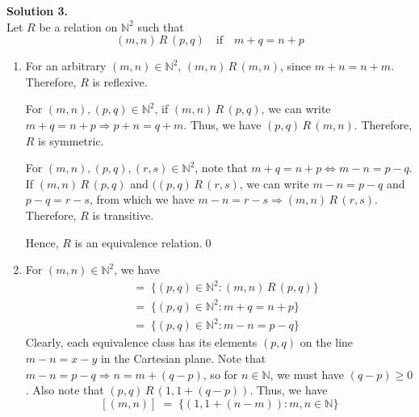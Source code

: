 \documentclass[10pt]{article}
\begin{document}
        \textbf{Solution 3.}\\
        Let $R$ be a relation on $\mathbb{N}^2$ such that
        \[(m, n)\,R\,(p, q) \quad\text{if}\quad m + q = n + p\]
        \begin{enumerate}
                \item For an arbitrary $(m, n) \in \mathbb{N}^2$, $(m, n)\,R\,(m, n)$, since $m + n = n + m$. Therefore, $R$
                is reflexive.

                For $(m, n), (p, q) \in \mathbb{N}^2$, if $(m, n)\,R\,(p, q)$, we can write $m + q = n + p \Rightarrow p + n = q + m$.
                Thus, we have $(p, q)\,R\,(m, n)$. Therefore, $R$ is symmetric.

                For $(m, n), (p, q), (r, s) \in \mathbb{N}^2$, note that $m + q = n + p \Leftrightarrow m - n = p - q$.
                If $(m, n)\,R\,(p, q)$ and $((p, q)\,R\,(r, s)$, we can write $m - n = p - q$ and $p - q = r - s$, from which we have
                $m - n = r - s \Rightarrow (m, n)\,R\,(r, s)$. Therefore, $R$ is transitive.

                Hence, $R$ is an equivalence relation.\qed

                \item For $(m, n) \in \mathbb{N}^2$, we have
                \begin{align*}
                [(m, n)] \;&=\; \{(p, q) \in \mathbb{N}^2 : (m, n)\,R\,(p, q)\} \\
                        \;&=\; \{(p, q) \in \mathbb{N}^2 : m + q = n + p\} \\
                        \;&=\; \{(p, q) \in \mathbb{N}^2 : m - n = p - q\}
                \end{align*}
                Clearly, each equivalence class has its elements $(p, q)$ on the line $m - n = x - y$ in the Cartesian plane.
                Note that $m - n = p - q \Rightarrow n = m + (q - p)$, so for $n \in \mathbb{N}$, we must have $(q - p) \geq 0$.
                Also note that $(p , q)\,R\,(1, 1 + (q - p))$. Thus, we have
                \[
                        [(m, n)] \;=\; \{(1, 1 + (n - m)): m, n \in \mathbb{N}\}
                \]
        \end{enumerate}
\end{document}
